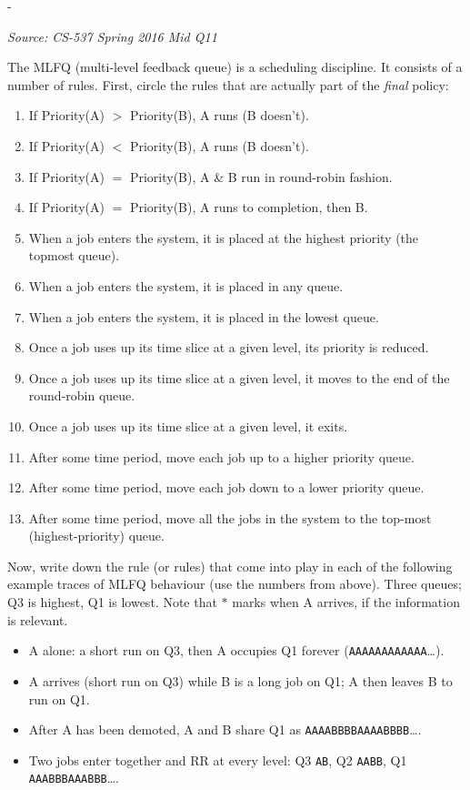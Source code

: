 \documentclass[11pt,a4paper]{article}
\makeatletter
\newcommand{\keepspace}[1]{\par\penalty-100\begingroup
  \setlength{\dimen@}{#1}\dimen@ii\pagegoal\advance\dimen@ii-\pagetotal
  \ifdim\dimen@>\dimen@ii\ifdim\dimen@ii>\z@\vfil\fi\break\fi\endgroup}
\newcounter{qn}[section]
\newenvironment{Qn}[4]{%
  \refstepcounter{qn}\keepspace{7\baselineskip}%
  \begin{tcolorbox}[qboxstyle, title={Q\thesection.\theqn\ \ [#1 \textbar\ #2]\ \ #4}]%
  {\footnotesize\color{g3}\textit{Source: #3}}\par\smallskip%
}{%
  \end{tcolorbox}%
}
\makeatother
\begin{document}
\begin{Qn}{Hard}{Lect 7}{CS-537 Spring 2016 Mid Q11}{Circle the real MLFQ rules, then name the rules in each trace}
The MLFQ (multi-level feedback queue) is a scheduling discipline. It consists of a number of rules. First, circle the rules that are actually part of the \emph{final} policy:
\begin{enumerate}
  \item If Priority(A) $>$ Priority(B), A runs (B doesn't).
  \item If Priority(A) $<$ Priority(B), A runs (B doesn't).
  \item If Priority(A) $=$ Priority(B), A \& B run in round-robin fashion.
  \item If Priority(A) $=$ Priority(B), A runs to completion, then B.
  \item When a job enters the system, it is placed at the highest priority (the topmost queue).
  \item When a job enters the system, it is placed in any queue.
  \item When a job enters the system, it is placed in the lowest queue.
  \item Once a job uses up its time slice at a given level, its priority is reduced.
  \item Once a job uses up its time slice at a given level, it moves to the end of the round-robin queue.
  \item Once a job uses up its time slice at a given level, it exits.
  \item After some time period, move each job up to a higher priority queue.
  \item After some time period, move each job down to a lower priority queue.
  \item After some time period, move all the jobs in the system to the top-most (highest-priority) queue.
\end{enumerate}
Now, write down the rule (or rules) that come into play in each of the following example traces of MLFQ behaviour (use the numbers from above). Three queues; Q3 is highest, Q1 is lowest. Note that $*$ marks when A arrives, if the information is relevant.
\begin{itemize}
  \item[(i)] A alone: a short run on Q3, then A occupies Q1 forever (\texttt{AAAAAAAAAAAA}\ldots).
  \item[(ii)] A arrives (short run on Q3) while B is a long job on Q1; A then leaves B to run on Q1.
  \item[(iii)] After A has been demoted, A and B share Q1 as \texttt{AAAABBBBAAAABBBB}\ldots.
  \item[(iv)] Two jobs enter together and RR at every level: Q3 \texttt{AB}, Q2 \texttt{AABB}, Q1 \texttt{AAABBBAAABBB}\ldots.
\end{itemize}
\end{Qn}
\end{document}
